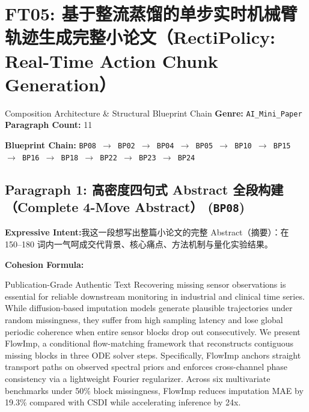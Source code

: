 \section{FT05: 基于整流蒸馏的单步实时机械臂轨迹生成完整小论文（RectiPolicy: Real-Time Action Chunk Generation）}\label{comp:FT05}
\begin{ConceptBox}{Composition Architecture \& Structural Blueprint Chain}
\textbf{Genre:} \texttt{AI\_Mini\_Paper} \quad \textbf{Paragraph Count:} 11\par
\textbf{Blueprint Chain:} \texttt{BP08 $\to$ BP02 $\to$ BP04 $\to$ BP05 $\to$ BP10 $\to$ BP15 $\to$ BP16 $\to$ BP18 $\to$ BP22 $\to$ BP23 $\to$ BP24}
\end{ConceptBox}
\subsection*{Paragraph 1: 高密度四句式 Abstract 全段构建（Complete 4-Move Abstract） (\texttt{BP08})}
\noindent\textbf{Expressive Intent:}\enspace 我这一段想写出整篇小论文的完整 Abstract（摘要）：在 150--180 词内一气呵成交代背景、核心痛点、方法机制与量化实验结果。\par
\noindent\textbf{Cohesion Formula:}\par\vspace{4pt}
\begin{ExampleBox}{Publication-Grade Authentic Text}
Recovering missing sensor observations is essential for reliable downstream monitoring in industrial and clinical time series. While diffusion-based imputation models generate plausible trajectories under random missingness, they suffer from high sampling latency and lose global periodic coherence when entire sensor blocks drop out consecutively. We present FlowImp, a conditional flow-matching framework that reconstructs contiguous missing blocks in three ODE solver steps. Specifically, FlowImp anchors straight transport paths on observed spectral priors and enforces cross-channel phase consistency via a lightweight Fourier regularizer. Across six multivariate benchmarks under 50\% block missingness, FlowImp reduces imputation MAE by 19.3\% compared with CSDI while accelerating inference by 24x.
\end{ExampleBox}

